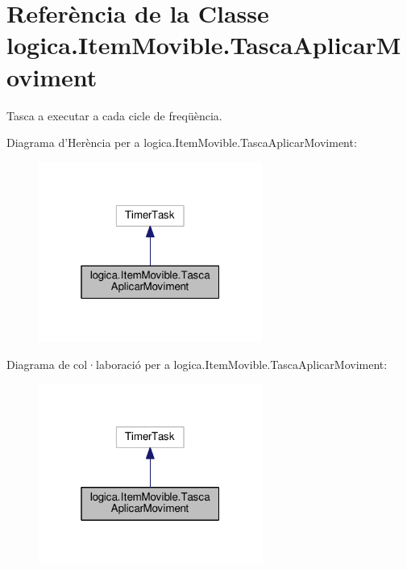 \hypertarget{classlogica_1_1_item_movible_1_1_tasca_aplicar_moviment}{\section{Referència de la Classe logica.\+Item\+Movible.\+Tasca\+Aplicar\+Moviment}
\label{classlogica_1_1_item_movible_1_1_tasca_aplicar_moviment}
}


Tasca a executar a cada cicle de freqüència.  




Diagrama d'Herència per a logica.\+Item\+Movible.\+Tasca\+Aplicar\+Moviment\+:
\nopagebreak
\begin{figure}[H]
\begin{center}
\leavevmode
\includegraphics[width=208pt]{classlogica_1_1_item_movible_1_1_tasca_aplicar_moviment__inherit__graph}
\end{center}
\end{figure}


Diagrama de col·laboració per a logica.\+Item\+Movible.\+Tasca\+Aplicar\+Moviment\+:
\nopagebreak
\begin{figure}[H]
\begin{center}
\leavevmode
\includegraphics[width=208pt]{classlogica_1_1_item_movible_1_1_tasca_aplicar_moviment__coll__graph}
\end{center}
\end{figure}
